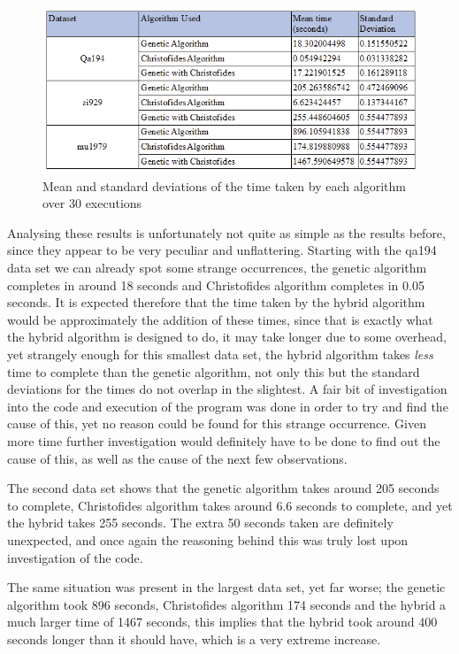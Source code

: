 \documentclass[11pt,a4paper,titlepage]{article}
\begin{document}
\begin{figure}[ht]
	\includegraphics[width=\textwidth]{MeanTime}
	\centering
	\caption{Mean and standard deviations of the time taken by each algorithm over 30 executions}
\end{figure}

Analysing these results is unfortunately not quite as simple as the results before, since they appear to be very peculiar and unflattering. Starting with the qa194 data set we can already spot some strange occurrences, the genetic algorithm completes in around 18 seconds and Christofides algorithm completes in 0.05 seconds. It is expected therefore that the time taken by the hybrid algorithm would be approximately the addition of these times, since that is exactly what the hybrid algorithm is designed to do, it may take longer due to some overhead, yet strangely enough for this smallest data set, the hybrid algorithm takes \textit{less} time to complete than the genetic algorithm, not only this but the standard deviations for the times do not overlap in the slightest. A fair bit of investigation into the code and execution of the program was done in order to try and find the cause of this, yet no reason could be found for this strange occurrence. Given more time further investigation would definitely have to be done to find out the cause of this, as well as the cause of the next few observations.

The second data set shows that the genetic algorithm takes around 205 seconds to complete, Christofides algorithm takes around 6.6 seconds to complete, and yet the hybrid takes 255 seconds. The extra 50 seconds taken are definitely unexpected, and once again the reasoning behind this was truly lost upon investigation of the code.

The same situation was present in the largest data set, yet far worse; the genetic algorithm took 896 seconds, Christofides algorithm 174 seconds and the hybrid a much larger time of 1467 seconds, this implies that the hybrid took around 400 seconds longer than it should have, which is a very extreme increase. 
\end{document}
